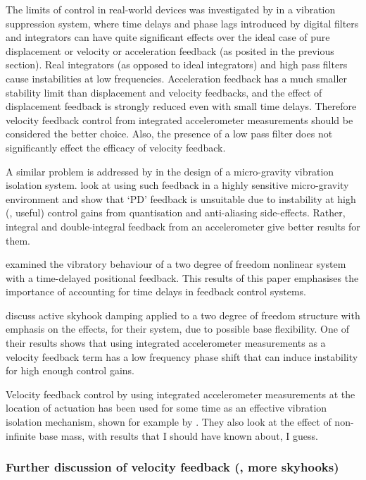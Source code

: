 The limits of control in real-world devices was investigated by \textcite{ananthaganeshan2001} in a vibration suppression system, where time delays and phase lags introduced by digital filters and integrators can have quite significant effects over the ideal case of pure displacement or velocity or acceleration feedback (as posited in the previous section).
Real integrators (as opposed to ideal integrators) and high pass filters cause instabilities at low frequencies.
Acceleration feedback has a much smaller stability limit than displacement and velocity feedbacks, and the effect of displacement feedback is strongly reduced even with small time delays.
Therefore velocity feedback control from integrated accelerometer measurements should be considered the better choice.
Also, the presence of a low pass filter does not significantly effect the efficacy of velocity feedback.

A similar problem is addressed by \textcite{zhu2006} in the design of a micro-gravity vibration isolation system. look at using such feedback in a highly sensitive micro-gravity environment and show that `PD' feedback is unsuitable due to instability at high (\ie, useful) control gains from quantisation and anti-aliasing side-effects.
Rather, integral and double-integral feedback from an accelerometer give better results for them.

\textcite{zhao2007} examined the vibratory behaviour of a two degree of freedom nonlinear system with a time-delayed positional feedback.
This results of this paper emphasises the importance of accounting for time delays in feedback control systems.

\textcite{serrand2000} discuss active skyhook damping applied to a two degree of freedom structure with emphasis on the effects, for their system, due to possible base flexibility.
One of their results shows that using integrated accelerometer measurements as a velocity feedback term has a low frequency phase shift that can induce instability for high enough control gains.

Velocity feedback control by using integrated accelerometer measurements at the location of actuation has been used for some time as an effective vibration isolation mechanism, shown for example by \textcite{kim1999}.
They also look at the effect of non-infinite base mass, with results that I should have known about, I guess.


\subsubsection{Further discussion of velocity feedback (\ie, more skyhooks)}

